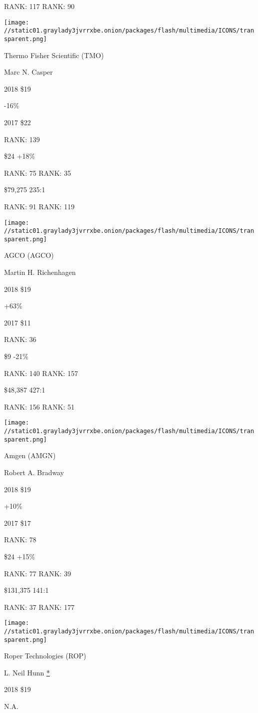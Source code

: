 RANK: 117 RANK: 90

\texttt{[image: //static01.graylady3jvrrxbe.onion/packages/flash/multimedia/ICONS/transparent.png]}

Thermo Fisher Scientific (TMO)

Marc N. Casper \protect\hyperlink{g-footnotes}{}

2018 \$19

 -16\%

2017 \$22

RANK: 139

 \$24 +18\%

RANK: 75 RANK: 35

 \$79,275 235:1

RANK: 91 RANK: 119

\texttt{[image: //static01.graylady3jvrrxbe.onion/packages/flash/multimedia/ICONS/transparent.png]}

AGCO (AGCO)

Martin H. Richenhagen \protect\hyperlink{g-footnotes}{}

2018 \$19

 +63\%

2017 \$11

RANK: 36

 \$9 -21\%

RANK: 140 RANK: 157

 \$48,387 427:1

RANK: 156 RANK: 51

\texttt{[image: //static01.graylady3jvrrxbe.onion/packages/flash/multimedia/ICONS/transparent.png]}

Amgen (AMGN)

Robert A. Bradway \protect\hyperlink{g-footnotes}{}

2018 \$19

 +10\%

2017 \$17

RANK: 78

 \$24 +15\%

RANK: 77 RANK: 39

 \$131,375 141:1

RANK: 37 RANK: 177

\texttt{[image: //static01.graylady3jvrrxbe.onion/packages/flash/multimedia/ICONS/transparent.png]}

Roper Technologies (ROP)

L. Neil Hunn \protect\hyperlink{g-footnotes}{*}

2018 \$19

 N.A.

